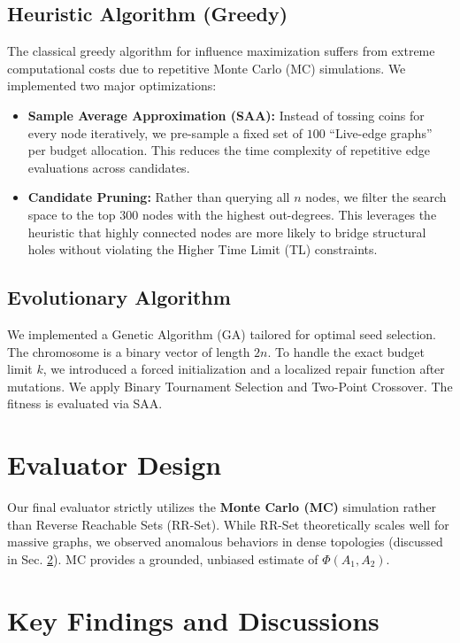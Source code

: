 \documentclass[conference]{IEEEtran}
\begin{document}
\subsection{Heuristic Algorithm (Greedy)}
The classical greedy algorithm for influence maximization suffers from extreme computational costs due to repetitive Monte Carlo (MC) simulations. We implemented two major optimizations:
\begin{itemize}
    \item \textbf{Sample Average Approximation (SAA):} Instead of tossing coins for every node iteratively, we pre-sample a fixed set of $100$ ``Live-edge graphs'' per budget allocation. This reduces the time complexity of repetitive edge evaluations across candidates.
    \item \textbf{Candidate Pruning:} Rather than querying all $n$ nodes, we filter the search space to the top $300$ nodes with the highest out-degrees. This leverages the heuristic that highly connected nodes are more likely to bridge structural holes without violating the Higher Time Limit (TL) constraints.
\end{itemize}

\subsection{Evolutionary Algorithm}
We implemented a Genetic Algorithm (GA) tailored for optimal seed selection. The chromosome is a binary vector of length $2n$. To handle the exact budget limit $k$, we introduced a forced initialization and a localized repair function after mutations. We apply Binary Tournament Selection and Two-Point Crossover. The fitness is evaluated via SAA.

\section{Evaluator Design}
Our final evaluator strictly utilizes the \textbf{Monte Carlo (MC)} simulation rather than Reverse Reachable Sets (RR-Set). While RR-Set theoretically scales well for massive graphs, we observed anomalous behaviors in dense topologies (discussed in Sec. \ref{sec:findings}). MC provides a grounded, unbiased estimate of $\Phi(A_1, A_2)$.

\section{Key Findings and Discussions}
\label{sec:findings}
\end{document}

